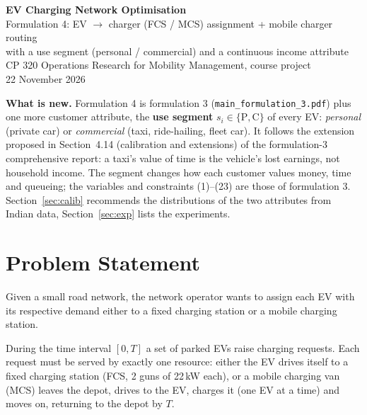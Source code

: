 \documentclass[12pt,a4paper]{article}
\begin{document}
\begin{center}
{\LARGE\bfseries\color{headblue} EV Charging Network Optimisation}\\[6pt]
{\large Formulation 4: EV $\rightarrow$ charger (FCS / MCS) assignment + mobile charger routing\\ with a use segment (personal / commercial) and a continuous income attribute}\\[4pt]
{\normalsize CP 320 Operations Research for Mobility Management, course project}\\[2pt]
{\normalsize 22 November 2026}
\end{center}
\vspace{4pt}

\begin{whatsnew}
\textbf{What is new.} Formulation 4 is formulation 3 (\texttt{main\_formulation\_3.pdf}) plus one more customer attribute, the \textbf{use segment} $s_i\in\{\mathrm P,\mathrm C\}$ of every EV: \emph{personal} (private car) or \emph{commercial} (taxi, ride-hailing, fleet car). It follows the extension proposed in Section~4.14 (calibration and extensions) of the formulation-3 comprehensive report: a taxi's value of time is the vehicle's lost earnings, not household income. The segment changes how each customer values money, time and queueing; the variables and constraints (1)--(23) are those of formulation 3. Section~\ref{sec:calib} recommends the distributions of the two attributes from Indian data, Section~\ref{sec:exp} lists the experiments.
\end{whatsnew}

\section{Problem Statement}

Given a small road network, the network operator wants to assign each EV with its respective demand either to a fixed charging station or a mobile charging station.

\hspace{1.5em}During the time interval $[0,T]$ a set of parked EVs raise charging requests. Each request must be served by exactly one resource: either the EV drives itself to a fixed charging station (FCS, 2 guns of 22\,kW each), or a mobile charging van (MCS) leaves the depot, drives to the EV, charges it (one EV at a time) and moves on, returning to the depot by $T$.
\end{document}
